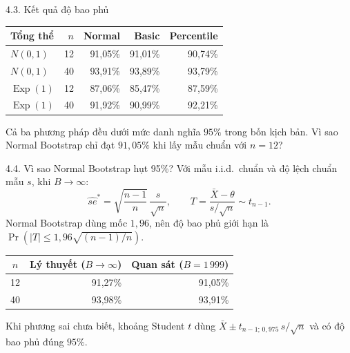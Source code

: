 \documentclass[aspectratio=43,10pt]{beamer}
\begin{document}
\begin{frame}{4.3. Kết quả độ bao phủ}
    \centering
    \begin{tabular}{lrrrr}
    \toprule
    Tổng thể & $n$ & Normal & Basic & Percentile\\
    \midrule
    $N(0,1)$ & 12 & 91,05\% & 91,01\% & 90,74\%\\
    $N(0,1)$ & 40 & 93,91\% & 93,89\% & 93,79\%\\
    $\operatorname{Exp}(1)$ & 12 & 87,06\% & 85,47\% & 87,59\%\\
    $\operatorname{Exp}(1)$ & 40 & 91,92\% & 90,99\% & 92,21\%\\
    \bottomrule
    \end{tabular}\par
    \medskip\raggedright
    Cả ba phương pháp đều dưới mức danh nghĩa $95\%$ trong bốn kịch bản.
    Vì sao Normal Bootstrap chỉ đạt $91{,}05\%$ khi lấy mẫu chuẩn với $n=12$?
\end{frame}

\begin{frame}{4.4. Vì sao Normal Bootstrap hụt 95\%?}
    \small
    Với mẫu i.i.d.\ chuẩn và độ lệch chuẩn mẫu $s$, khi $B\to\infty$:
    \[
    \widehat{se}^*=\sqrt{\frac{n-1}{n}}\,\frac{s}{\sqrt n},
    \qquad T=\frac{\bar X-\theta}{s/\sqrt n}\sim t_{n-1}.
    \]
    Normal Bootstrap dùng mốc $1{,}96$, nên độ bao phủ giới hạn là
    \(\Pr\!\left(|T|\le 1{,}96\sqrt{(n-1)/n}\right)\).
    \medskip

    \centering
    \begin{tabular}{crr}
    \toprule $n$ & Lý thuyết ($B\to\infty$) & Quan sát ($B=1\,999$)\\
    \midrule
    12 & 91,27\% & 91,05\%\\
    40 & 93,98\% & 93,91\%\\
    \bottomrule
    \end{tabular}\par
    \medskip\raggedright
    Khi phương sai chưa biết, khoảng Student
    $t$ dùng $\bar X\pm t_{n-1;\,0{,}975}\,s/\sqrt n$ và có độ bao phủ đúng $95\%$.
\end{frame}
\end{document}
